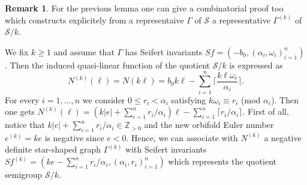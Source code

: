 \documentclass[oneside]{amsart}
\numberwithin{equation}{section}
\numberwithin{equation}{subsection}
\theoremstyle{plain}
\theoremstyle{definition}
\newtheorem{remark}[equation]{Remark}
\def\Z{\mathbb Z}
\newcommand{\calS}{{\mathcal S}}\newcommand{\cals}{{\bf s}}\newcommand{\calst}{{\bf st}}\newcommand{\cS}{{\mathcal S}}
\newcommand{\w}{\omega}
\newcommand{\al}{\alpha}
\renewcommand{\Z}{\mathbb{Z}}
\newcommand{\Se}{\mathcal{S}}
\begin{document}
\begin{remark}\label{rem:quotient}
 For the previous lemma one can give a combinatorial proof too which constructs explicitely from a representaive $\Gamma$ of $\Se$ a representative  $\Gamma^{(k)}$ of $\Se/k$.

We fix $k\geq 1$ and assume that $\Gamma$ has Seifert invariants $ Sf=(-b_0, (\al_i,\w_i )_{i=1}^n)$. Then the induced quasi-linear function of the quotient $\calS/k$  is expressed as 
 $$N^{(k)}(\ell)=N(k\ell)=b_0k\ell - \sum_{i=1}^n \Big\lceil \frac{k\ell \w_i}{\al_i}\Big\rceil.$$
 For every $i=1,\dots,n$ we consider  $0\leq r_i <\al_i$ satisfying $k\w_i \equiv r_i$ (mod $\al_i$). 
Then one gets $N^{(k)}(\ell)=(k|e|+\sum_{i=1}^n r_i/\al_i)\ell - \sum_{i=1}^n \lceil r_i/\al_i\rceil$. First of all, notice that $k|e|+\sum_{i=1}^n r_i/\al_i\in \Z_{>0}$ and  the new orbifold Euler number $e^{(k)}=ke$ is negative since $e<0$. Hence, we can associate with $N^{(k)}$ a negative definite star-shaped graph $\Gamma^{(k)}$ with Seifert invariants  $ Sf^{(k)}=(ke-\sum_{i=1}^n r_i/\al_i, (\al_i,r_i )_{i=1}^n)$ which represents the quotient semigroup $\calS/k$.
 
\end{remark}
\end{document}
